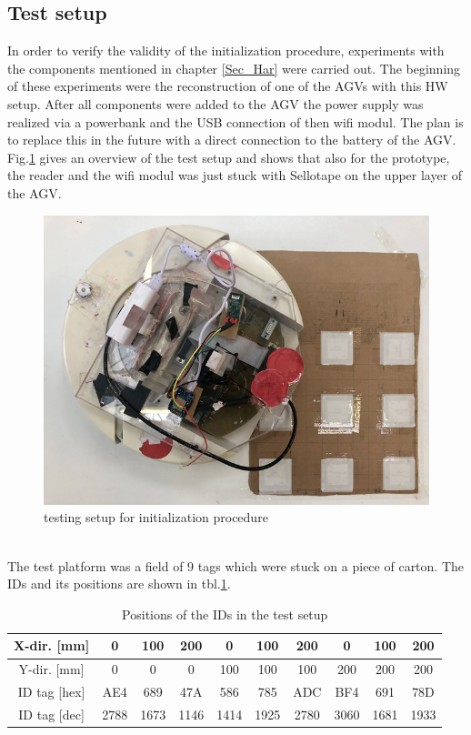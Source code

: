 \subsection{Test setup}
In order to verify the validity of the initialization procedure, experiments with the components mentioned in chapter \ref{Sec_Har} were carried out. The beginning of these experiments were the reconstruction of one of the AGVs with this HW setup. After all components were added to the AGV the power supply was realized via a powerbank and the USB connection of then wifi modul. The plan is to replace this in the future with a direct connection to the battery of the AGV. Fig.\ref{TestSetup} gives an overview of the test setup and shows that also for the prototype, the reader and the wifi modul was just stuck with Sellotape on the upper layer of the AGV.\\
\begin{figure}[!htbp]
\centering
\includegraphics[width = 14cm]{Pictures/TestSetup}
\caption{testing setup for initialization procedure}
\label{TestSetup}
\end{figure}\\
The test platform was a field of 9 tags which were stuck on a piece of carton. The IDs and its positions are shown in tbl.\ref{IDs_Setup}.\\
\begin{table}[!htbp]
\begin{tabular}{|c|c|c|c|c|c|c|c|c|c|}
\hline
X-dir. [mm] & 0    & 100  & 200  & 0    & 100  & 200  & 0    & 100  & 200  \\ \hline
Y-dir. [mm] & 0    & 0    & 0    & 100  & 100  & 100  & 200  & 200  & 200  \\ \hline
ID tag [hex]    & AE4  & 689  & 47A  & 586  & 785  & ADC  & BF4  & 691  & 78D  \\ \hline
ID tag [dec]    & 2788 & 1673 & 1146 & 1414 & 1925 & 2780 & 3060 & 1681 & 1933 \\ \hline
\end{tabular}
\caption{Positions of the IDs in the test setup}
\label{IDs_Setup}
\end{table}\\
